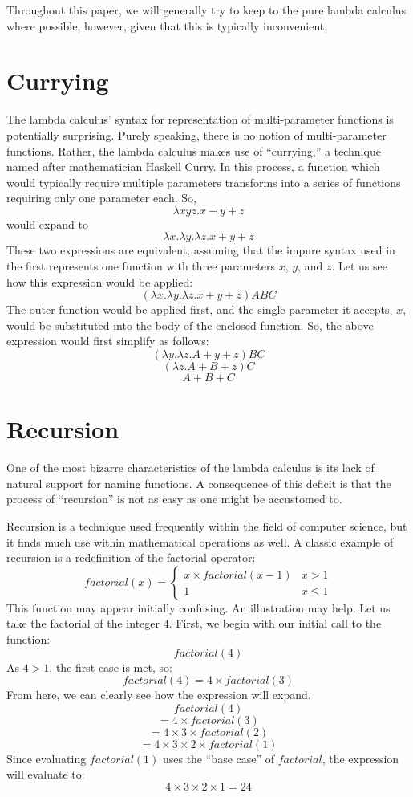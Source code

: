 \documentclass[twocolumn,titlepage,12pt]{article}
\begin{document}
Throughout this paper, we will generally try to keep to the pure lambda calculus where possible, however, given that this is typically inconvenient,

\section{Currying}
The lambda calculus' syntax for representation of multi-parameter functions is potentially surprising. Purely speaking, there is no notion of multi-parameter functions. Rather, the lambda calculus makes use of ``currying,'' a technique named after mathematician Haskell Curry. In this process, a function which would typically require multiple parameters transforms into a series of functions requiring only one parameter each. So,
$$\lambda xyz.x+y+z$$
would expand to
$$\lambda x.\lambda y.\lambda z.x+y+z$$
These two expressions are equivalent, assuming that the impure syntax used in the first represents one function with three parameters $x$, $y$, and $z$. Let us see how this expression would be applied:
$$(\lambda x.\lambda y.\lambda z.x+y+z)ABC$$
The outer function would be applied first, and the single parameter it accepts, $x$, would be substituted into the body of the enclosed function. So, the above expression would first simplify as follows:
$$(\lambda y.\lambda z.A+y+z)BC$$
$$(\lambda z.A+B+z)C$$
$$A+B+C$$

\section{Recursion}
One of the most bizarre characteristics of the lambda calculus is its lack of natural support for naming functions. A consequence of this deficit is that the process of ``recursion'' is not as easy as one might be accustomed to.

Recursion is a technique used frequently within the field of computer science, but it finds much use within mathematical operations as well. A classic example of recursion is a redefinition of the factorial operator:
\[
factorial(x)=
\begin{cases}
    x\times factorial(x-1) & x>1 \\
    1 & x\leq 1
\end{cases}
\]
This function may appear initially confusing. An illustration may help. Let us take the factorial of the integer $4$. First, we begin with our initial call to the function:
$$factorial(4)$$
As $4>1$, the first case is met, so:
$$factorial(4)=4\times factorial(3)$$
From here, we can clearly see how the expression will expand.
$$factorial(4)$$
$$=4\times factorial(3)$$
$$=4\times 3\times factorial(2)$$
$$=4\times 3\times 2\times factorial(1)$$
Since evaluating $factorial(1)$ uses the ``base case'' of $factorial$, the expression will evaluate to:
$$4\times 3\times 2\times 1=24$$
\end{document}
